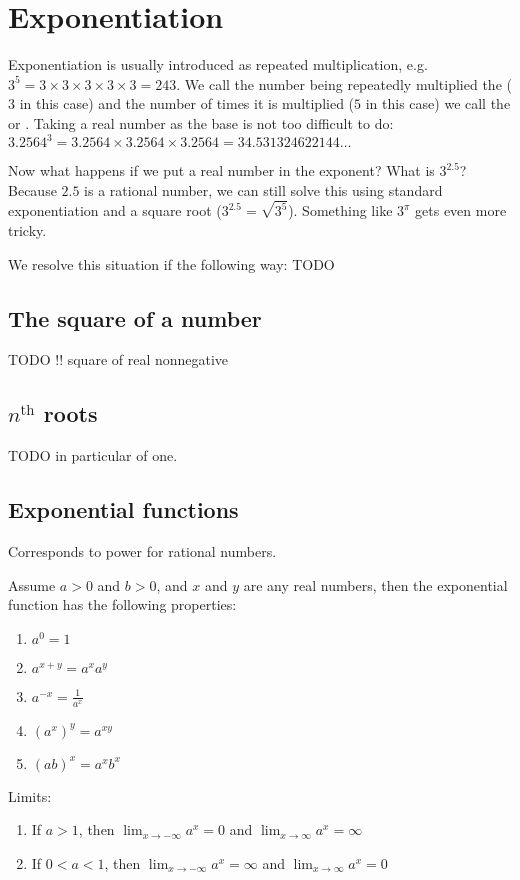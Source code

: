 \section{Exponentiation}
Exponentiation is usually introduced as repeated multiplication, e.g. $3^5 = 3\times 3\times 3 \times 3 \times 3 = 243$.  We call the number being repeatedly multiplied the  ($3$ in this case) and the number of times it is multiplied ($5$ in this case) we call the  or . Taking a real number as the base is not too difficult to do: $3.2564^3 = 3.2564\times 3.2564\times 3.2564 = 34.531324622144\ldots$

Now what happens if we put a real number in the exponent? What is $3^{2.5}$? Because $2.5$ is a rational number, we can still solve this using standard exponentiation and a square root ($3^{2.5} = \sqrt{3^5}$). Something like $3^\pi$ gets even more tricky.

We resolve this situation if the following way: TODO

\subsection{The square of a number}
TODO
!! square of real nonnegative

\subsection{$n^\text{th}$ roots}
TODO in particular of one.


\subsection{Exponential functions}
Corresponds to power for rational numbers.

Assume $a>0$ and $b>0$, and $x$ and $y$ are any real numbers, then the exponential function has the following properties:
\begin{enumerate}
\item $a^0 = 1$
\item $a^{x+y} = a^x a^y$
\item $a^{-x} = \frac{1}{a^x}$
\item $(a^x)^y = a^{xy}$
\item $(ab)^x = a^x b^x$
\end{enumerate}
Limits:
\begin{enumerate}
\item If $a>1$, then $\lim_{x\to -\infty} a^x = 0$ and $ \lim_{x\to \infty} a^x = \infty$
\item If $0 < a < 1$, then $\lim_{x\to -\infty} a^x = \infty$ and $ \lim_{x\to \infty} a^x = 0$
\end{enumerate}

